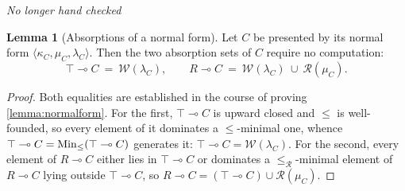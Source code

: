 \documentclass{article}
\theoremstyle{definition}
\newtheorem{lemma}{Lemma}[section]
\newcommand{\cR}{\mathcal{R}}
\newcommand{\cW}{\mathcal{W}}
\begin{document}
{\it No longer hand checked}


\begin{lemma}[Absorptions of a normal form]
    \label{cor:nfabsorption}
    Let $C$ be presented by its normal form $\langle\kappa_C,\mu_C,\lambda_C\rangle$. Then the two absorption sets of $C$ require no computation:
    $$\top\multimap C\ =\ \cW(\lambda_C),\qquad R\multimap C\ =\ \cW(\lambda_C)\ \cup\ \cR(\mu_C).$$
\end{lemma}
\begin{proof}
    Both equalities are established in the course of proving \cref{lemma:normalform}. For the first, $\top\multimap C$ is upward closed and $\leq$ is well-founded, so every element of it dominates a $\leq$-minimal one, whence $\top\multimap C={\rm Min}_\leq(\top\multimap C)$ generates it: $\top\multimap C=\cW(\lambda_C)$. For the second, every element of $R\multimap C$ either lies in $\top\multimap C$ or dominates a $\leq_\cR$-minimal element of $R\multimap C$ lying outside $\top\multimap C$, so $R\multimap C=(\top\multimap C)\cup\cR(\mu_C)$.
\end{proof}
\end{document}
